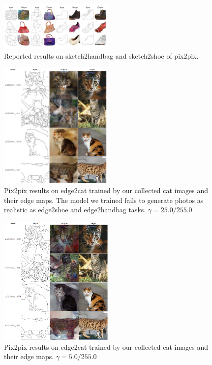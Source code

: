 \begin{figure}
	\includegraphics[width=0.5\textwidth]{figures/pix2pix/reported_sketch2handbag}
	\caption{\label{pix2pix_sketch2shoeNhandbag}Reported results on sketch2handbag and sketch2shoe of pix2pix.}
\end{figure}

\begin{figure}
	\includegraphics[width=0.5\textwidth]{figures/pix2pix/edge2cat}
	\caption{\label{pix2pix_edge2cat}Pix2pix results on edge2cat trained by our collected cat images and their edge maps. The model we trained fails to generate photos as realistic as edge2shoe and edge2handbag tasks. $\gamma = 25.0/255.0$}
\end{figure}
\begin{figure}
	\includegraphics[width=0.5\textwidth]{figures/pix2pix/edge2photo/gamma_5/results.png}
	\caption{\label{pix2pix_edge2cat_gamma5}Pix2pix results on edge2cat trained by our collected cat images and their edge maps. $\gamma = 5.0/255.0$}
\end{figure}
